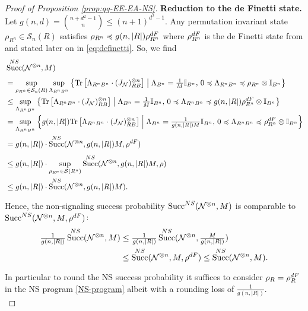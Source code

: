 \documentclass[a4paper,onecolumn,11pt,accepted=2025-10-01]{quantumarticle}
\DeclareMathOperator{\suc}{Succ}
\newcommand*{\cN}{\mathcal{N}}
\newcommand*{\cS}{\mathcal{S}}
\newcommand*{\tr}[1]{\mathrm{Tr}\left[#1\right]}
\newcommand*{\mle}{\preccurlyeq}
\begin{document}
\begin{proof}[Proof of Proposition \ref{prop:qq-EE-EA-NS}]
\textbf{Reduction to the de Finetti state.} Let  $g(n,d) = \binom{n+d^2-1}{n}\le (n+1)^{d^2-1}$. Any permutation invariant state $\rho_{R^n}\in \cS_n(R)$ satisfies $ \rho_{R^n} \mle g(n,|R|) \rho_{R^n}^{\rm{dF}}$ where $\rho_{R^n}^{\rm{dF}}$ is the de Finetti state from \cite{christandl2009postselection} and stated later on in \eqref{eq:definetti}. So, we find
\begin{align}
    &\suc_{}^{\rm{NS}}(\cN^{\otimes n},M) \\&=\sup_{\rho_{R^n} \in \cS_n(R)} \sup_{\Lambda_{R^nB^n}} \left\{\tr{\Lambda_{R^nB^n} \cdot (J_{\cN})_{RB}^{\otimes n}} \;\middle|\; \Lambda_{B^n} = \tfrac{1}{M}\mathbb{I}_{B^n},\, 0\mle  \Lambda_{R^nB^n} \mle \rho_{R^n} \otimes  \mathbb{I}_{B^n}\right\}
           \\&\le  \sup_{\Lambda_{R^nB^n}} \left\{\tr{\Lambda_{R^nB^n} \cdot (J_{\cN})_{RB}^{\otimes n}} \; \middle| \; \Lambda_{B^n} = \tfrac{1}{M}\mathbb{I}_{B^n}, \,0\mle  \Lambda_{R^nB^n} \mle g(n,|R|) \rho_{R^n}^{\rm{dF}} \otimes  \mathbb{I}_{B^n}   \right\}
           \\&= \sup_{\Lambda_{R^nB^n}} \left\{g(n,|R|)\tr{\Lambda_{R^nB^n}\cdot (J_{\cN})_{RB}^{\otimes n}} \; \middle| \; \Lambda_{B^n} = \tfrac{1}{g(n,|R|) M}\mathbb{I}_{B^n}, \,0\mle  \Lambda_{R^nB^n} \mle  \rho_{R^n}^{\rm{dF}} \otimes  \mathbb{I}_{B^n}   \right\}
           \\&= g(n,|R|)\cdot \suc_{}^{\rm{NS}}(\cN^{\otimes n}, g(n,|R|)M ,  \rho^{\rm{dF}}) 
           \\&\le g(n,|R|) \cdot \sup_{\rho_{R^n} \in \cS(R^n)}  \suc_{}^{\rm{NS}}(\cN^{\otimes n}, g(n,|R|)M ,  \rho) 
          \\&\le g(n,|R|)\cdot \suc_{}^{\rm{NS}}(\cN^{\otimes n}, g(n,|R|) M).
\end{align}
Hence, the non-signaling success probability  $\suc_{}^{\rm{NS}}(\cN^{\otimes n},M)$ is comparable   to  $\suc_{}^{\rm{NS}}(\cN^{\otimes n}, M, \rho^{\rm{dF}})$:
\begin{align}
     \tfrac{1}{g(n,|R|)}\suc^{\rm{NS}}(\cN^{\otimes n},M)&\le \tfrac{1}{g(n,|R|)}\suc^{\rm{NS}}(\cN^{\otimes n}, \tfrac{M}{g(n,|R|)}) 
     \\&\le \suc_{}^{\rm{NS}}(\cN^{\otimes n},M,  \rho^{\rm{dF}}) \le  \suc^{\rm{NS}}(\cN^{\otimes n},M).\label{eq:tilde-succ}
\end{align}
In particular to round the NS success probability it suffices to consider $\rho_R = \rho_R^{\rm{dF}}$ in the NS program \eqref{NS-program} albeit with a rounding loss of $\frac{1}{g(n,|R|)}$.\\


\end{proof}
\end{document}

